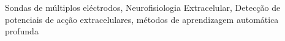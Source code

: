 \begin{palavraschave}
Sondas de múltiplos eléctrodos, Neurofisiologia Extracelular, Detecção de potenciais de acção extracelulares, métodos de aprendizagem automática profunda
\end{palavraschave}
\clearpage
\thispagestyle{empty}
\cleardoublepage
